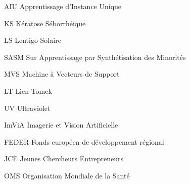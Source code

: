            {AIU}
            {Apprentissage d'Instance Unique}
            
            {KS}
            {Kératose Séborrhéique}
            
            {LS}
            {Lentigo Solaire}    
            
            {SASM}
            {Sur Apprentissage par Synthétisation des Minorités}
            
            {MVS}
            {Machine à Vecteurs de Support}
            
            {LT}
            {Lien Tomek}
            
            {UV}
            {Ultraviolet}

            {ImViA}
            {Imagerie et Vision Artificielle}
            
            {FEDER}
            {Fonds européen de développement régional}

            {JCE}
            {Jeunes Chercheurs Entrepreneurs}
  
            {OMS}
            {Organisation Mondiale de la Santé}          
            